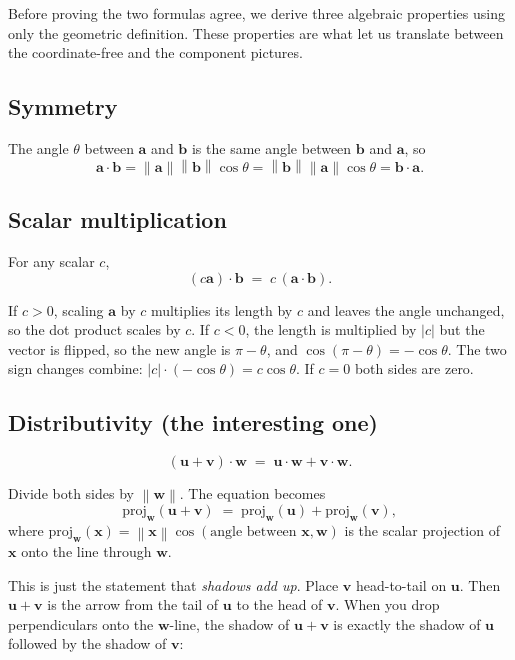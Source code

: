 \documentclass[11pt]{article}
\newcommand{\vect}[1]{\mathbf{#1}}
\newcommand{\norm}[1]{\left\lVert #1 \right\rVert}
\begin{document}
Before proving the two formulas agree, we derive three algebraic properties using only the geometric definition. These properties are what let us translate between the coordinate-free and the component pictures.

\subsection*{Symmetry}

The angle $\theta$ between $\vect{a}$ and $\vect{b}$ is the same angle between $\vect{b}$ and $\vect{a}$, so
\[
  \vect{a}\cdot\vect{b} = \norm{\vect{a}}\norm{\vect{b}}\cos\theta = \norm{\vect{b}}\norm{\vect{a}}\cos\theta = \vect{b}\cdot\vect{a}.
\]

\subsection*{Scalar multiplication}

For any scalar $c$,
\[
  (c\vect{a})\cdot\vect{b} \;=\; c\,(\vect{a}\cdot\vect{b}).
\]

If $c>0$, scaling $\vect{a}$ by $c$ multiplies its length by $c$ and leaves the angle unchanged, so the dot product scales by $c$. If $c<0$, the length is multiplied by $|c|$ but the vector is flipped, so the new angle is $\pi-\theta$, and $\cos(\pi-\theta) = -\cos\theta$. The two sign changes combine: $|c|\cdot(-\cos\theta) = c\cos\theta$. If $c=0$ both sides are zero.

\subsection*{Distributivity (the interesting one)}

\[
  (\vect{u}+\vect{v})\cdot\vect{w} \;=\; \vect{u}\cdot\vect{w} + \vect{v}\cdot\vect{w}.
\]

Divide both sides by $\norm{\vect{w}}$. The equation becomes
\[
  \text{proj}_{\vect{w}}(\vect{u}+\vect{v}) \;=\; \text{proj}_{\vect{w}}(\vect{u}) + \text{proj}_{\vect{w}}(\vect{v}),
\]
where $\text{proj}_{\vect{w}}(\vect{x}) = \norm{\vect{x}}\cos(\text{angle between }\vect{x},\vect{w})$ is the scalar projection of $\vect{x}$ onto the line through $\vect{w}$.

This is just the statement that \emph{shadows add up}. Place $\vect{v}$ head-to-tail on $\vect{u}$. Then $\vect{u}+\vect{v}$ is the arrow from the tail of $\vect{u}$ to the head of $\vect{v}$. When you drop perpendiculars onto the $\vect{w}$-line, the shadow of $\vect{u}+\vect{v}$ is exactly the shadow of $\vect{u}$ followed by the shadow of $\vect{v}$:
\end{document}
